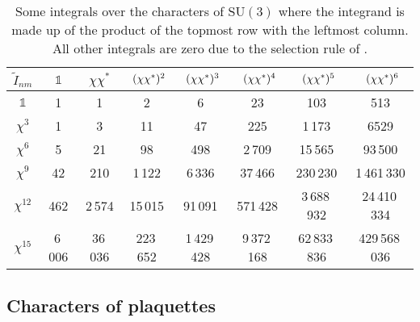 \begin{table}
  \begin{center}
    \begin{tabular}{*8c} \toprule
      {$\tilde{I}_{nm}$} & $\mathbb{1}$ & $\chi\chi^*$ & $(\chi\chi^*)\mathrlap{^2}$ & $(\chi\chi^*)\mathrlap{^3}$ 
        & $(\chi\chi^*)\mathrlap{^4}$ & $(\chi\chi^*)\mathrlap{^5}$ & $(\chi\chi^*)\mathrlap{^6}$ \\\midrule
      $\mathbb{1}$ & 1 & 1 & 2 & 6 & 23 & 103 & 513 \\
      $\chi^3$ & 1 & 3 & 11 & 47 & 225 & 1\,173 & 6529 \\
      $\chi^6$ & 5 & 21 & 98 & 498 & 2\,709 & 15\,565 & 93\,500 \\
      $\chi^9$ & 42 & 210 & 1\,122 & 6\,336 & 37\,466 & 230\,230 & 1\,461\,330 \\
      $\chi^{12}$ & 462 & 2\,574 & 15\,015 & 91\,091 & 571\,428  & 3\,688\,932 & 24\,410\,334 \\
      $\chi^{15}$ & 6\,006 & 36\,036 & 223\,652 & 1\,429\,428 & 9\,372\,168 & 62\,833\,836 & 429\,568\,036 \\\bottomrule
    \end{tabular}
  \end{center}
  \caption{Some integrals over the characters of SU$(3)$ where the integrand is made
    up of the product of the topmost row with the leftmost column. All other
    integrals are zero due to the selection rule of
    \protect{}.}
  \label{tab:character-integrals}
\end{table}

\subsection{Characters of plaquettes}

